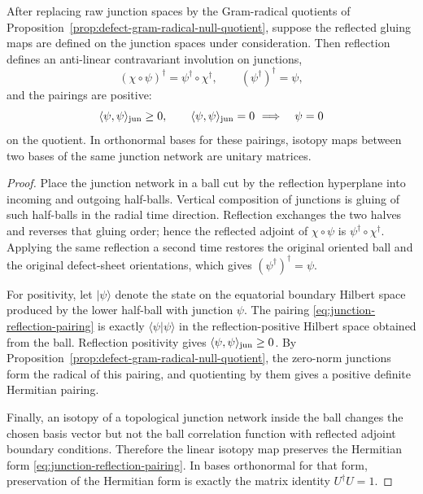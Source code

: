 \begin{proposition}
\label{prop:reflection-positivity-dagger-defect-category}
After replacing raw junction spaces by the Gram-radical quotients of
Proposition~\ref{prop:defect-gram-radical-null-quotient}, suppose the
reflected gluing maps are defined on the junction spaces under consideration.
Then reflection defines an anti-linear
contravariant involution on junctions,
\begin{equation}
  (\chi\circ\psi)^\dagger=\psi^\dagger\circ\chi^\dagger,
  \qquad
  (\psi^\dagger)^\dagger=\psi,
  \label{eq:defect-dagger-composition}
\end{equation}
and the pairings are positive:
\[
  \langle\psi,\psi\rangle_{\rm jun}\ge0,
  \qquad
  \langle\psi,\psi\rangle_{\rm jun}=0
  \ \Longrightarrow\quad
  \psi=0
\]
on the quotient.  In orthonormal bases for these pairings, isotopy maps
between two bases of the same junction network are unitary matrices.
\end{proposition}

\begin{proof}
Place the junction network in a ball cut by the reflection hyperplane into
incoming and outgoing half-balls.  Vertical composition of junctions is
gluing of such half-balls in the radial time direction.  Reflection exchanges
the two halves and reverses that gluing order; hence the reflected adjoint of
\(\chi\circ\psi\) is \(\psi^\dagger\circ\chi^\dagger\).  Applying the same
reflection a second time restores the original oriented ball and the original
defect-sheet orientations, which gives \((\psi^\dagger)^\dagger=\psi\).

For positivity, let \(|\psi\rangle\) denote the state on the equatorial
boundary Hilbert space produced by the lower half-ball with junction
\(\psi\).  The pairing
\eqref{eq:junction-reflection-pairing} is exactly
\(\langle\psi|\psi\rangle\) in the reflection-positive Hilbert space obtained
from the ball.  Reflection positivity gives
\(\langle\psi,\psi\rangle_{\rm jun}\ge0\).  By
Proposition~\ref{prop:defect-gram-radical-null-quotient}, the zero-norm
junctions form the radical of this pairing, and quotienting by them gives a
positive definite Hermitian pairing.

Finally, an isotopy of a topological junction network inside the ball changes
the chosen basis vector but not the ball correlation function with reflected
adjoint boundary conditions.  Therefore the linear isotopy map preserves the
Hermitian form \eqref{eq:junction-reflection-pairing}.  In bases orthonormal
for that form, preservation of the Hermitian form is exactly the matrix
identity \(U^\dagger U=1\).
\end{proof}

